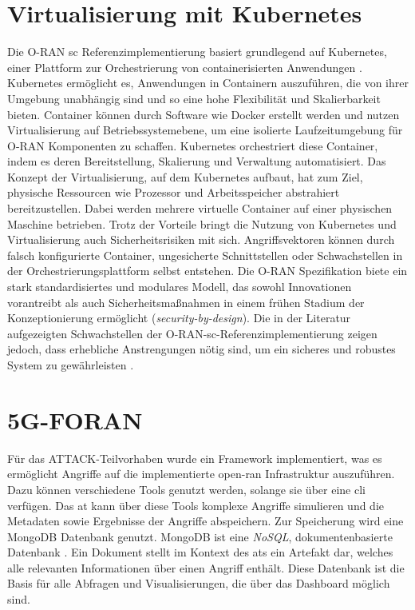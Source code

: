 \section{Virtualisierung mit Kubernetes}
Die O-RAN \gls{sc} Referenzimplementierung basiert grundlegend auf Kubernetes, einer Plattform zur Orchestrierung von containerisierten Anwendungen \autocite{ReleaseReleasesConfluence}. Kubernetes ermöglicht es, Anwendungen in Containern auszuführen, die von ihrer Umgebung unabhängig sind und so eine hohe Flexibilität und Skalierbarkeit bieten. Container können durch Software wie Docker erstellt werden und nutzen Virtualisierung auf Betriebssystemebene, um eine isolierte Laufzeitumgebung für O-RAN Komponenten zu schaffen. Kubernetes orchestriert diese Container, indem es deren Bereitstellung, Skalierung und Verwaltung automatisiert. Das Konzept der Virtualisierung, auf dem Kubernetes aufbaut, hat zum Ziel, physische Ressourcen wie Prozessor und Arbeitsspeicher abstrahiert bereitzustellen. Dabei werden mehrere virtuelle Container auf einer physischen Maschine betrieben. Trotz der Vorteile bringt die Nutzung von Kubernetes und Virtualisierung auch Sicherheitsrisiken mit sich. Angriffsvektoren können durch falsch konfigurierte Container, ungesicherte Schnittstellen oder Schwachstellen in der Orchestrierungsplattform selbst entstehen.
Die O-RAN Spezifikation biete ein stark standardisiertes und modulares Modell, das sowohl Innovationen vorantreibt als auch Sicherheitsmaßnahmen in einem frühen Stadium der Konzeptionierung ermöglicht (\textit{security-by-design}). Die in der Literatur aufgezeigten Schwachstellen der O-RAN-\gls{sc}-Referenzimplementierung zeigen jedoch, dass erhebliche Anstrengungen nötig sind, um ein sicheres und robustes System zu gewährleisten \autocite{klementSecuringOpenRAN2024}.

\section{5G-FORAN}
\label{sec:tech-foran}
Für das ATTACK-Teilvorhaben wurde ein Framework implementiert, was es ermöglicht Angriffe auf die implementierte \gls{open-ran} Infrastruktur auszuführen. Dazu können verschiedene Tools genutzt werden, solange sie über eine \gls{cli} verfügen. Das \gls{at} kann über diese Tools komplexe Angriffe simulieren und die Metadaten sowie Ergebnisse der Angriffe abspeichern. Zur Speicherung wird eine MongoDB Datenbank genutzt. MongoDB ist eine \textit{NoSQL}, dokumentenbasierte Datenbank \autocite{MongoDBDeveloperData}. Ein Dokument stellt im Kontext des \glspl{at} ein Artefakt dar, welches alle relevanten Informationen über einen Angriff enthält. Diese Datenbank ist die Basis für alle Abfragen und Visualisierungen, die über das Dashboard möglich sind.

